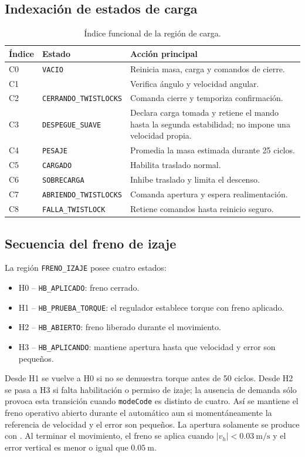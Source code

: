 \documentclass[a4paper,10pt,onecolumn,journal]{ieeeconf}
\numberwithin{equation}{section}
\begin{document}

\clearpage
\subsection{Indexación de estados de carga}
\begin{table}[H]
\centering
\caption{Índice funcional de la región de carga.}
\begin{tabular}{C{1.2cm} L{5cm} L{7.2cm}}
\toprule
Índice & Estado & Acción principal\\
\midrule
C0 & \texttt{VACIO} & Reinicia masa, carga y comandos de cierre.\\
C1 &  & Verifica ángulo y velocidad angular.\\
C2 & \texttt{CERRANDO\_TWISTLOCKS} & Comanda cierre y temporiza confirmación.\\
C3 & \texttt{DESPEGUE\_SUAVE} & Declara carga tomada y retiene el mando hasta la segunda estabilidad; no impone una velocidad propia.\\
C4 & \texttt{PESAJE} & Promedia la masa estimada durante 25 ciclos.\\
C5 & \texttt{CARGADO} & Habilita traslado normal.\\
C6 & \texttt{SOBRECARGA} & Inhibe traslado y limita el descenso.\\
C7 & \texttt{ABRIENDO\_TWISTLOCKS} & Comanda apertura y espera realimentación.\\
C8 & \texttt{FALLA\_TWISTLOCK} & Retiene comandos hasta reinicio seguro.\\
\bottomrule
\end{tabular}
\end{table}




\subsection{Secuencia del freno de izaje}
La región \texttt{FRENO\_IZAJE} posee cuatro estados:
\begin{itemize}
    \item H0 -- \texttt{HB\_APLICADO}: freno cerrado.
    \item H1 -- \texttt{HB\_PRUEBA\_TORQUE}: el regulador establece torque con freno aplicado.
    \item H2 -- \texttt{HB\_ABIERTO}: freno liberado durante el movimiento.
    \item H3 -- \texttt{HB\_APLICANDO}: mantiene apertura hasta que velocidad y error son pequeños.
\end{itemize}
Desde H1 se vuelve a H0 si no se demuestra torque antes de 50 ciclos. Desde H2 se pasa a H3 si falta habilitación o permiso de izaje; la ausencia de demanda sólo provoca esta transición cuando \texttt{modeCode} es distinto de cuatro. Así se mantiene el freno operativo abierto durante el automático aun si momentáneamente la referencia de velocidad y el error son pequeños. La apertura solamente se produce con . Al terminar el movimiento, el freno se aplica cuando $|v_h|<0.03~\mathrm{m/s}$ y el error vertical es menor o igual que $0.05~\mathrm{m}$.
\end{document}
